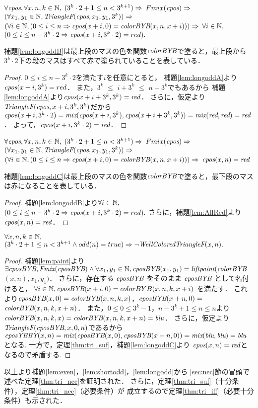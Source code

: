 \begin{lem}[\LongOddB] \label{lem:longoddB}
  $\forall \textit{cpos}, \forall x, n, k \in \mathbb{N},$
  $(3^k \cdot 2 + 1 \leq n < 3^{k+1}) \Rightarrow$
  $Fmix(\textit{cpos}) \Rightarrow $
  $(\forall x_1, y_1 \in \mathbb{N}, \textit{TriangleF}(\textit{cpos},x_1,y_1,3^k)) \Rightarrow$
  $(\forall i \in \mathbb{N}, (0 \leq i \leq n \Rightarrow \textit{cpos}(x+i,0) = \textit{colorBYB}(x,n,x+i))) \Rightarrow$
  $\forall i \in \mathbb{N},$ $(0 \leq i \leq n - 3^k \cdot 2 \Rightarrow \textit{cpos}(x+i,3^k \cdot 2) = red).$
\end{lem}
補題\ref{lem:longoddB}は最上段のマスの色を関数$\textit{colorBYB}$で塗ると，最上段から$3^k\cdot2$下の段のマスはすべて赤で塗られていることを表している．
\begin{proof}
  $0 \leq i \leq n - 3^k \cdot 2$を満たす$i$を任意にとると，
  補題\ref{lem:longoddA}より$\textit{cpos}(x+i,3^k) = red$．
  また，$3^k$ $\leq$ $i+3^k$ $\leq$ $n - 3^k$でもあるから
  補題\ref{lem:longoddA}より$\textit{cpos}(x+i+3^k,3^k) =\textit{red}$．
  さらに，仮定より$\textit{TriangleF}(\textit{cpos},x+i,3^k,3^k)$だから
  $cpos(x+i,3^k \cdot 2)=\textit{mix}(\textit{cpos}(x+i,3^k),\textit{cpos}(x+i+3^k,3^k))=\textit{mix}(\textit{red},\textit{red})=\textit{red}$．
  よって，$\textit{cpos}(x+i,3^k \cdot 2)=\textit{red}$．
\end{proof}

\begin{lem}[\LongOddC] \label{lem:longoddC}
  $\forall \textit{cpos}, \forall x, n, k \in \mathbb{N},$
  $(3^k \cdot 2 + 1 \leq n < 3^{k+1}) \Rightarrow$
  $Fmix(\textit{cpos}) \Rightarrow $
  $(\forall x_1, y_1 \in \mathbb{N}, \textit{TriangleF}(\textit{cpos},x_1,y_1,3^k)) \Rightarrow$
  $(\forall i \in \mathbb{N}, (0 \leq i \leq n \Rightarrow \textit{cpos}(x+i,0) = \textit{colorBYB}(x,n,x+i))) \Rightarrow$
  $\textit{cpos}(x,n) = \textit{red}$
\end{lem}
補題\ref{lem:longoddC}は最上段のマスの色を関数$\textit{colorBYB}$で塗ると，最下段のマスは赤になることを表している．
\begin{proof}
  補題\ref{lem:longoddB}より$\forall i \in \mathbb{N},$ $(0 \leq i \leq n - 3^k \cdot 2 \Rightarrow \textit{cpos}(x+i,3^k \cdot 2) = red).$
  さらに，補題\ref{lem:AllRed}より$\textit{cpos}(x,n)=\textit{red}$．
\end{proof}
\begin{lem}[\LongOdd] \label{lem:longodd}
  $\forall x, n, k \in \mathbb{N},$
  $(3^k\cdot2 + 1 \leq n < 3^{k+1} \land odd(n) = true) \Rightarrow \lnot\textit{WellColoredTriangleF}(x,n).$
\end{lem}
\begin{proof}
  補題\ref{lem:paint}より
  $\exists \textit{cposBYB}, \textit{Fmix}(\textit{cposBYB}) \land \forall x_1, y_1 \in \mathbb{N}, \textit{cposBYB}(x_1,y_1) = \textit{liftpaint}(\textit{colorBYB}$ $(x,n),x_1,y_1)$．
  さらに，存在する $\textit{cposBYB}$ をそのまま $\textit{cposBYB}$ として名付けると，
  $\forall i \in \mathbb{N}, \textit{cposBYB}(x+i,0) = colorBYB(x,n,k,x+i)$ を満たす．
  これより$\textit{cposBYB}(x,0) = \textit{colorBYB}(x,n,k,x)$，$\textit{cposBYB}(x+n,0) = $
  $\textit{colorBYB}(x,n,k,x+n)$．
  また，$0 \leq 0 \leq 3^k-1$，$n-3^k+1 \leq n \leq n$より
  $\textit{colorBYB}(x,n,k,x)=\textit{colorBYB}(x,n,k,x+n)=\textit{blu}$．
  さらに，仮定より$\textit{TriangleF}(\textit{cposBYB},x,0,n)$であるから
  $\textit{cposYBBY}(x,n)=\textit{mix}(\textit{cposBYB}(x,0),\textit{cposBYB}(x+n,0))=\textit{mix}(\textit{blu},\textit{blu})=\textit{blu}$
  となる.
  一方で，定理\ref{thm:tri_suf}，補題\ref{lem:longoddC}より
  $\textit{cpos}(x,n)=\textit{red}$となるので矛盾する.
\end{proof}

以上より補題\ref{lem:even}，\ref{lem:shortodd}，\ref{lem:longodd}から
\ref{sec:nec}節の冒頭で述べた定理\ref{thm:tri_nec}を証明された．
さらに，定理\ref{thm:tri_suf}（十分条件），定理\ref{thm:tri_nec}（必要条件）が
成立するので定理\ref{thm:tri_iff}（必要十分条件）も示された．
